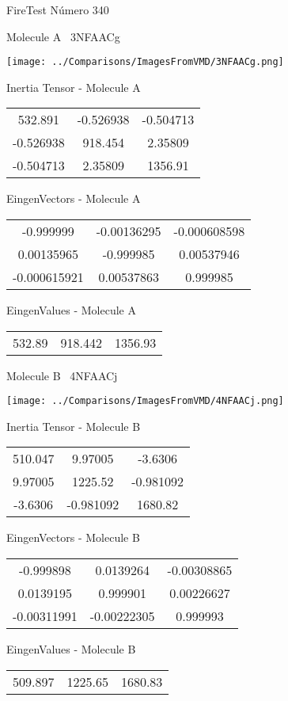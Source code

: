 \vtab[-3cm]
\begin{center}
{\large FireTest \tab Número 340}
\end{center}
\begin{multicols}{2}
\begin{center}

Molecule A \
3NFAACg

\texttt{[image: ../Comparisons/ImagesFromVMD/3NFAACg.png]}

Inertia Tensor - Molecule A \\
\begin{tabular}{|c c c|}
532.891	 & 	-0.526938	 & 	-0.504713	 \\
-0.526938	 & 	918.454	 & 	2.35809	 \\
-0.504713	 & 	2.35809	 & 	1356.91
\end{tabular}

\vtab
 EingenVectors - Molecule A     \\
\begin{tabular}{|c c c|}
-0.999999	 & 	-0.00136295	 & 	-0.000608598	 \\
0.00135965	 & 	-0.999985	 & 	0.00537946	 \\
-0.000615921	 & 	0.00537863	 & 	0.999985
\end{tabular}

\vtab
 EingenValues - Molecule A     \\
\begin{tabular}{|c c c|}
532.89	 & 	918.442	 & 	1356.93	 \\
\end{tabular}
\columnbreak

Molecule B \
4NFAACj

\texttt{[image: ../Comparisons/ImagesFromVMD/4NFAACj.png]}

Inertia Tensor - Molecule B \\
\begin{tabular}{|c c c|}
510.047	 & 	9.97005	 & 	-3.6306	 \\
9.97005	 & 	1225.52	 & 	-0.981092	 \\
-3.6306	 & 	-0.981092	 & 	1680.82
\end{tabular}

\vtab
 EingenVectors - Molecule B     \\
\begin{tabular}{|c c c|}
-0.999898	 & 	0.0139264	 & 	-0.00308865	 \\
0.0139195	 & 	0.999901	 & 	0.00226627	 \\
-0.00311991	 & 	-0.00222305	 & 	0.999993
\end{tabular}

\vtab
 EingenValues - Molecule B     \\
\begin{tabular}{|c c c|}
509.897	 & 	1225.65	 & 	1680.83	 \\
\end{tabular}

\end{center}
\end{multicols}

